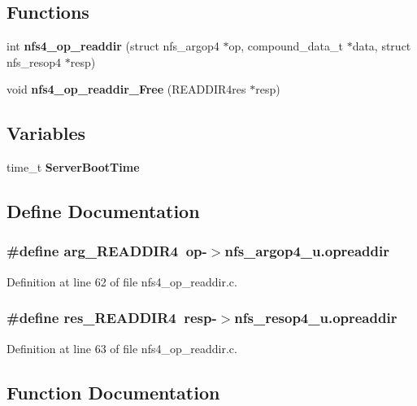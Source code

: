 \subsection*{Functions}
\begin{DoxyCompactItemize}
\item 
int {\bf nfs4\_\-op\_\-readdir} (struct nfs\_\-argop4 $\ast$op, compound\_\-data\_\-t $\ast$data, struct nfs\_\-resop4 $\ast$resp)
\item 
void {\bf nfs4\_\-op\_\-readdir\_\-Free} (READDIR4res $\ast$resp)
\end{DoxyCompactItemize}
\subsection*{Variables}
\begin{DoxyCompactItemize}
\item 
time\_\-t {\bf ServerBootTime}
\end{DoxyCompactItemize}


\subsection{Define Documentation}
\subsubsection[{arg\_\-READDIR4}]{\setlength{\rightskip}{0pt plus 5cm}\#define arg\_\-READDIR4~op-\/$>$nfs\_\-argop4\_\-u.opreaddir}\label{nfs4__op__readdir_8c_a9d7f38a94db656e965133d2775db49cd}


Definition at line 62 of file nfs4\_\-op\_\-readdir.c.
\subsubsection[{res\_\-READDIR4}]{\setlength{\rightskip}{0pt plus 5cm}\#define res\_\-READDIR4~resp-\/$>$nfs\_\-resop4\_\-u.opreaddir}\label{nfs4__op__readdir_8c_a4431793853d48901cff825fcd7b56869}


Definition at line 63 of file nfs4\_\-op\_\-readdir.c.

\subsection{Function Documentation}
